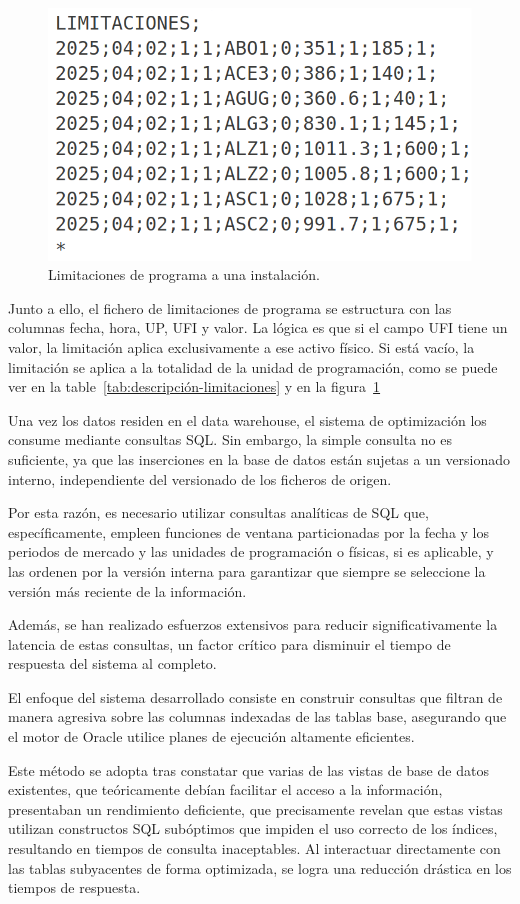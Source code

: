 \begin{figure}
  \centering
  \includegraphics[width=0.5\linewidth]{figures/contenido-limitaciones.png}
  \caption{Limitaciones de programa a una instalación.}
  \label{fig:contenido-limitaciones}
\end{figure}

Junto a ello, el fichero de limitaciones de programa se estructura con las columnas fecha, hora, UP, UFI y valor. La lógica es que si el campo UFI tiene un valor, la limitación aplica exclusivamente a ese activo físico. Si está vacío, la limitación se aplica a la totalidad de la unidad de programación, como se puede ver en la table~\ref{tab:descripción-limitaciones} y en la figura~\ref{fig:contenido-limitaciones}

Una vez los datos residen en el data warehouse, el sistema de optimización los consume mediante consultas SQL. Sin embargo, la simple consulta no es suficiente, ya que las inserciones en la base de datos están sujetas a un versionado interno, independiente del versionado de los ficheros de origen.

Por esta razón, es necesario utilizar consultas analíticas de SQL que, específicamente, empleen funciones de ventana particionadas por la fecha y los periodos de mercado y las unidades de programación o físicas, si es aplicable, y las ordenen por la versión interna para garantizar que siempre se seleccione la versión más reciente de la información.

Además, se han realizado esfuerzos extensivos para reducir significativamente la latencia de estas consultas, un factor crítico para disminuir el tiempo de respuesta del sistema al completo.

El enfoque del sistema desarrollado consiste en construir consultas que filtran de manera agresiva sobre las columnas indexadas de las tablas base, asegurando que el motor de Oracle utilice planes de ejecución altamente eficientes.

Este método se adopta tras constatar que varias de las vistas de base de datos existentes, que teóricamente debían facilitar el acceso a la información, presentaban un rendimiento deficiente, que precisamente revelan que estas vistas utilizan constructos SQL subóptimos que impiden el uso correcto de los índices, resultando en tiempos de consulta inaceptables. Al interactuar directamente con las tablas subyacentes de forma optimizada, se logra una reducción drástica en los tiempos de respuesta.

